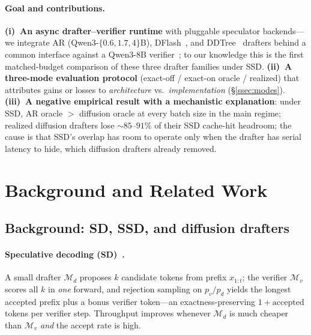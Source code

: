 \documentclass{article}
\begin{document}
\paragraph{Goal and contributions.}
\textbf{(i)~An async drafter--verifier runtime} with pluggable speculator backends---we integrate AR (Qwen3-$\{0.6,1.7,4\}$B), DFlash~\citep{dflash2025}, and DDTree~\citep{ringel2026ddtree} drafters behind a common interface against a Qwen3-8B verifier~\citep{yang2024qwen3}; to our knowledge this is the first matched-budget comparison of these three drafter families under SSD.
\textbf{(ii)~A three-mode evaluation protocol} (exact-off / exact-on oracle / realized) that attributes gains or losses to \emph{architecture} vs.\ \emph{implementation} (\S\ref{ssec:modes}).
\textbf{(iii)~A negative empirical result with a mechanistic explanation}: under SSD, AR oracle $>$ diffusion oracle at every batch size in the main regime; realized diffusion drafters lose ${\sim}85$--$91\%$ of their SSD cache-hit headroom; the cause is that SSD's overlap has room to operate only when the drafter has serial latency to hide, which diffusion drafters already removed.

\section{Background and Related Work}
\label{sec:related}

\subsection{Background: SD, SSD, and diffusion drafters}
\label{ssec:bg}

\paragraph{Speculative decoding (SD)~\citep{leviathan2023specdec,chen2023specsampling}.}
A small drafter $\mathcal{M}_d$ proposes $k$ candidate tokens from prefix $x_{1:t}$; the verifier $\mathcal{M}_v$ scores all $k$ in \emph{one} forward, and rejection sampling on $p_v/p_d$ yields the longest accepted prefix plus a bonus verifier token---an exactness-preserving $1{+}\text{accepted}$ tokens per verifier step.
Throughput improves whenever $\mathcal{M}_d$ is much cheaper than $\mathcal{M}_v$ \emph{and} the accept rate is high.
\end{document}
